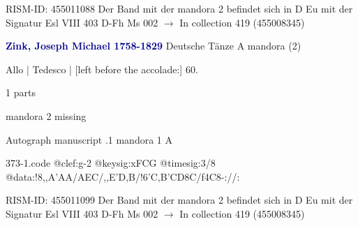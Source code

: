 \documentclass[twocolumn]{book}
\begin{document}
\newline RISM-ID: 455011088
\newline Der Band mit der mandora 2 befindet sich in D Eu mit der Signatur Esl VIII 403
\newline D-Fh  Ms 002
\newline $\rightarrow$ In collection 419 (455008345)

\newline \par \vspace{7pt} \textcolor{darkblue}{\textbf{Zink, Joseph Michael  1758-1829}}
\newline Deutsche Tänze  A  
\newline mandora (2)
\newline \begin{itshape}[f.31v, at left:] Allo | Tedesco | [left before the accolade:] 60.\end{itshape} 
\newline \textcolor{darkblue}{}  1 parts  
\newline \begin{small} mandora 2 missing\end{small} 
\newline Autograph manuscript
.1  mandora 1  A  
\begin{filecontents*}{373-1.code}
@clef:g-2
@keysig:xFCG
@timesig:3/8
@data:!8,,A'AA/AEC/,,E'D,B/!{6'C,B'CD8C}/f4C8-://:
\end{filecontents*}
\newline
%

\newline RISM-ID: 455011099
\newline Der Band mit der mandora 2 befindet sich in D Eu mit der Signatur Esl VIII 403
\newline D-Fh  Ms 002
\newline $\rightarrow$ In collection 419 (455008345)
\end{document}
